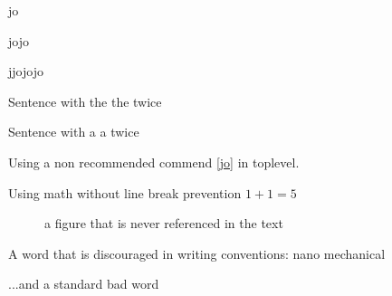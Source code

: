 
jo

jojo

jjojojo

Sentence with the the twice

Sentence with a a twice

Using a non recommended commend \ref{jo} in toplevel.

Using math without line break prevention $1+1=5$

\begin{figure}
  \caption{a figure that is never referenced in the text}
  \label{fig:thefigure}
\end{figure}

A word that is discouraged in writing conventions: nano mechanical

...and a standard bad word 


